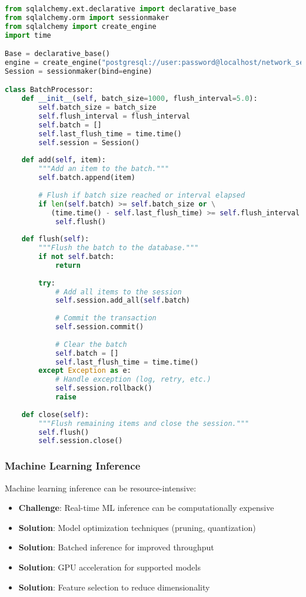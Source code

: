 \begin{lstlisting}[language=python, caption=Batch Database Operations]
from sqlalchemy.ext.declarative import declarative_base
from sqlalchemy.orm import sessionmaker
from sqlalchemy import create_engine
import time

Base = declarative_base()
engine = create_engine("postgresql://user:password@localhost/network_security")
Session = sessionmaker(bind=engine)

class BatchProcessor:
    def __init__(self, batch_size=1000, flush_interval=5.0):
        self.batch_size = batch_size
        self.flush_interval = flush_interval
        self.batch = []
        self.last_flush_time = time.time()
        self.session = Session()
        
    def add(self, item):
        """Add an item to the batch."""
        self.batch.append(item)
        
        # Flush if batch size reached or interval elapsed
        if len(self.batch) >= self.batch_size or \
           (time.time() - self.last_flush_time) >= self.flush_interval:
            self.flush()
            
    def flush(self):
        """Flush the batch to the database."""
        if not self.batch:
            return
            
        try:
            # Add all items to the session
            self.session.add_all(self.batch)
            
            # Commit the transaction
            self.session.commit()
            
            # Clear the batch
            self.batch = []
            self.last_flush_time = time.time()
        except Exception as e:
            # Handle exception (log, retry, etc.)
            self.session.rollback()
            raise
            
    def close(self):
        """Flush remaining items and close the session."""
        self.flush()
        self.session.close()
\end{lstlisting}

\subsubsection{Machine Learning Inference}
Machine learning inference can be resource-intensive:

\begin{itemize}
    \item \textbf{Challenge}: Real-time ML inference can be computationally expensive
    \item \textbf{Solution}: Model optimization techniques (pruning, quantization)
    \item \textbf{Solution}: Batched inference for improved throughput
    \item \textbf{Solution}: GPU acceleration for supported models
    \item \textbf{Solution}: Feature selection to reduce dimensionality
\end{itemize}

